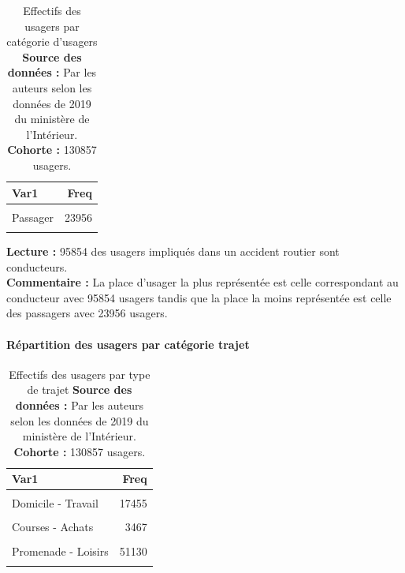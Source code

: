 \documentclass[french,]{tp}
\let\oldparagraph\paragraph
\renewcommand{\paragraph}[1]{\oldparagraph{#1}\mbox{}}
\begin{document}
\begin{table}[H]

\caption{\label{tab:tablecatu}Effectifs des usagers par catégorie d'usagers
\textbf{Source des données :} Par les auteurs selon les données de 2019 du ministère de l'Intérieur.\\
\textbf{Cohorte :} 130857 usagers.\\}
\centering
\begin{tabular}[t]{lr}
\toprule
\textbf{Var1} & \textbf{Freq}\\
\midrule
\cellcolor{gray!6}{Conducteur} & \cellcolor{gray!6}{95854}\\
Passager & 23956\\
\cellcolor{gray!6}{Piéton} & \cellcolor{gray!6}{11047}\\
\bottomrule
\end{tabular}
\end{table}

\textbf{Lecture :} 95854 des usagers impliqués dans un accident routier sont conducteurs.\\
\textbf{Commentaire :} La place d'usager la plus représentée est celle correspondant au conducteur avec 95854 usagers tandis que la place la moins représentée est celle des passagers avec 23956 usagers.

\hypertarget{ruxe9partition-des-usagers-par-catuxe9gorie-trajet}{%
\paragraph{Répartition des usagers par catégorie trajet}\label{ruxe9partition-des-usagers-par-catuxe9gorie-trajet}}





\begin{table}[H]

\caption{\label{tab:tabletrajet}Effectifs des usagers par type de trajet
\textbf{Source des données :} Par les auteurs selon les données de 2019 du ministère de l'Intérieur.\\
\textbf{Cohorte :} 130857 usagers.\\}
\centering
\begin{tabular}[t]{lr}
\toprule
\textbf{Var1} & \textbf{Freq}\\
\midrule
\cellcolor{gray!6}{Non renseigné} & \cellcolor{gray!6}{34322}\\
Domicile - Travail & 17455\\
\cellcolor{gray!6}{Domicile - École} & \cellcolor{gray!6}{2796}\\
Courses - Achats & 3467\\
\cellcolor{gray!6}{Utilisation professionnnelle} & \cellcolor{gray!6}{12359}\\
\addlinespace
Promenade - Loisirs & 51130\\
\cellcolor{gray!6}{Autre} & \cellcolor{gray!6}{9328}\\
\bottomrule
\end{tabular}
\end{table}
\end{document}
